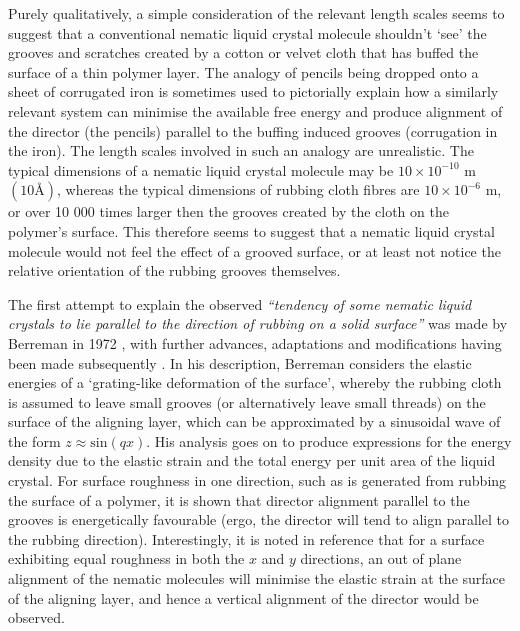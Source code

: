 Purely qualitatively, a simple consideration of the relevant length scales seems to suggest that a conventional nematic liquid crystal molecule shouldn't `see' the grooves and scratches created by a cotton or velvet cloth that has buffed the surface of a thin polymer layer. The analogy of pencils being dropped onto a sheet of corrugated iron is sometimes used to pictorially explain how a similarly relevant system can minimise the available free energy and produce alignment of the director (the pencils) parallel to the buffing induced grooves (corrugation in the iron). The length scales involved in such an analogy are unrealistic. The typical dimensions of a nematic liquid crystal molecule may be $10\times 10^{-10}$ m $\left(10\text{\AA}\right)$, whereas the typical dimensions of rubbing cloth fibres are $10\times10^{-6}$ m, or over 10 000 times larger then the grooves created by the cloth on the polymer's surface. This therefore seems to suggest that a nematic liquid crystal molecule would not feel the effect of a grooved surface, or at least not notice the relative orientation of the rubbing grooves themselves.

The first attempt to explain the observed \textit{``tendency of some nematic liquid crystals to lie parallel to the direction of rubbing on a solid surface''} was made by Berreman in 1972 \cite{Berreman1972a}, with further advances, adaptations and modifications having been made subsequently \cite{Faetti1987}. In his description, Berreman considers the elastic energies of a `grating-like deformation of the surface', whereby the rubbing cloth is assumed to leave small grooves (or alternatively leave small threads) on the surface of the aligning layer, which can be approximated by a sinusoidal wave of the form $z\approx\text{sin}\left(qx\right)$. His analysis goes on to produce expressions for the energy density due to the elastic strain and the total energy per unit area of the liquid crystal. For surface roughness in one direction, such as is generated from rubbing the surface of a polymer, it is shown that director alignment parallel to the grooves is energetically favourable (ergo, the director will tend to align parallel to the rubbing direction). Interestingly, it is noted in reference \cite{Berreman1972a} that for a surface exhibiting equal roughness in both the $x$ and $y$ directions, an out of plane alignment of the nematic molecules will minimise the elastic strain at the surface of the aligning layer, and hence a vertical alignment of the director would be observed.

